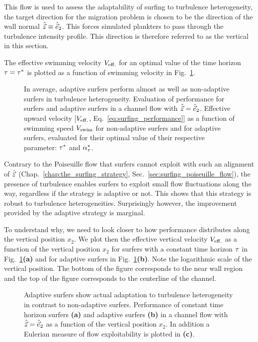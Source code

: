 This flow is used to assess the adaptability of surfing to turbulence heterogeneity, the target direction for the migration problem is chosen to be the direction of the wall normal $\hat{\vec{z}} \equiv \hat{\vec{e}}_2$.
This forces simulated plankters to pass through the turbulence intensity profile.
This direction is therefore referred to as the vertical in this section.

The effective swimming velocity $V_{\mathrm{eff.}}$ for an optimal value of the time horizon $\tau = \tau^*$ is plotted as a function of swimming velocity in Fig.~\ref{fig:channel_perf_y}.
\begin{figure}
	\centering
	
	\caption[In average, adaptive surfers perform almost as well as non-adaptive surfers in turbulence heterogeneity.]{
		In average, adaptive surfers perform almost as well as non-adaptive surfers in turbulence heterogeneity.
		Evaluation of performance for surfers and adaptive surfers in a channel flow with $\hat{\vec{z}} = \hat{\vec{e}}_2$.
		Effective upward velocity [$V_{\mathrm{eff.}}$, Eq.~\eqref{eq:surfing_performance}] as a function of swimming speed $V_{\mathrm{swim}}$ for non-adaptive surfers and for adaptive surfers, evaluated for their optimal value of their respective parameter: $\tau^*$ and  $\alpha_{\tau}^*$.
	}
	\label{fig:channel_perf_y}
\end{figure}
Contrary to the Poiseuille flow that surfers cannot exploit with such an alignment of $\hat{\vec{z}}$ (Chap.~\ref{chap:the_surfing_strategy}, Sec.~\ref{sec:surfing_poiseuille_flow}), the presence of turbulence enables surfers to exploit small flow fluctuations along the way, regardless if the strategy is adaptive or not.
This shows that this strategy is robust to turbulence heterogeneities.
Surprisingly however, the improvement provided by the adaptive strategy is marginal.

To understand why, we need to look closer to how performance distributes along the vertical position $x_2$.
We plot then the effective vertical velocity $V_{\mathrm{eff.}}$ as a function of the vertical position $x_2$ for surfers with a constant time horizon $\tau$ in Fig.~\ref{fig:channel_perf_y}\textbf{(a)} and for adaptive surfers in Fig.~\ref{fig:channel_perf_y}\textbf{(b)}.
Note the logarithmic scale of the vertical position.
The bottom of the figure corresponds to the near wall region and the top of the figure corresponds to the centerline of the channel.
\begin{figure}
	\centering
	
	\caption[Adaptive surfers show actual adaptation to turbulence heterogeneity in contrast to non-adaptive surfers.]{
		Adaptive surfers show actual adaptation to turbulence heterogeneity in contrast to non-adaptive surfers.
		Performance of constant time horizon surfers \textbf{(a)} and adaptive surfers \textbf{(b)} in a channel flow with $\hat{\vec{z}} = \hat{\vec{e}}_2$ as a function of the vertical position $x_2$. 
		In addition a Eulerian measure of flow exploitability is plotted in \textbf{(c)}.
	}
	\label{fig:channel_binned_velocity_y}
\end{figure}

